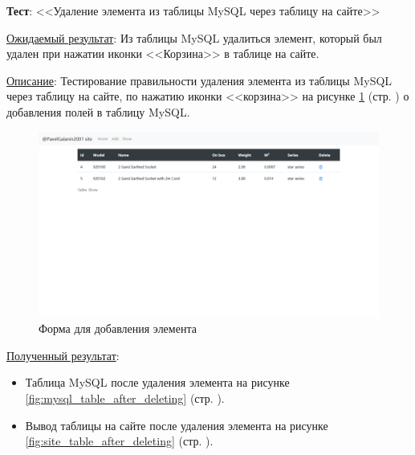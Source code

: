 \textbf{Тест}: <<Удаление элемента из таблицы MySQL через таблицу на сайте>>

\underline{Ожидаемый результат}:
Из таблицы MySQL удалиться элемент, который был удален при нажатии иконки <<Корзина>> в таблице на сайте.

\underline{Описание}:
Тестирование правильности удаления элемента из таблицы MySQL через таблицу на сайте, по нажатию иконки <<корзина>>
на рисунке \ref{fig:test_delete_element__site_table}
(стр. \pageref{fig:test_delete_element__site_table})
о добавления полей в таблицу MySQL.

\begin{figure}[!htp]
    \begin{center}
        \includegraphics[width=12cm]{../_input/tests/site_table_after.png}
    \end{center}
    \caption{Форма для добавления элемента\label{fig:test_delete_element__site_table}}
\end{figure}

\underline{Полученный результат}:

\begin{itemize}
    \item Таблица MySQL после удаления элемента
    на рисунке \ref{fig:mysql_table_after_deleting}
    (стр. \pageref{fig:mysql_table_after_deleting}).

    \item Вывод таблицы на сайте после удаления элемента
    на рисунке \ref{fig:site_table_after_deleting}
    (стр. \pageref{fig:site_table_after_deleting}).
\end{itemize}

